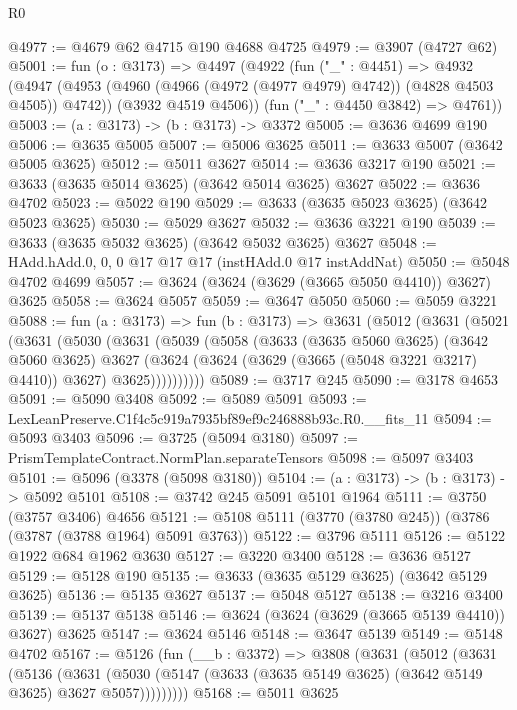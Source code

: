 \begin{lexlean}{R0}
\begin{coremodule}
@4977 := @4679 @62 @4715 @190 @4688 @4725
@4979 := @3907 (@4727 @62)
@5001 := fun (o : @3173) =>
  @4497
    (@4922
      (fun ("_" : @4451) =>
      @4932
        (@4947 (@4953 (@4960 (@4966 (@4972 (@4977 @4979) @4742)) (@4828 @4503 @4505)) @4742))
        (@3932 @4519 @4506))
      (fun ("_" : @4450 @3842) => @4761))
@5003 := (a : @3173) -> (b : @3173) -> @3372
@5005 := @3636 @4699 @190
@5006 := @3635 @5005
@5007 := @5006 @3625
@5011 := @3633 @5007 (@3642 @5005 @3625)
@5012 := @5011 @3627
@5014 := @3636 @3217 @190
@5021 := @3633 (@3635 @5014 @3625) (@3642 @5014 @3625) @3627
@5022 := @3636 @4702
@5023 := @5022 @190
@5029 := @3633 (@3635 @5023 @3625) (@3642 @5023 @3625)
@5030 := @5029 @3627
@5032 := @3636 @3221 @190
@5039 := @3633 (@3635 @5032 @3625) (@3642 @5032 @3625) @3627
@5048 := HAdd.hAdd.{0, 0, 0} @17 @17 @17 (instHAdd.{0} @17 instAddNat)
@5050 := @5048 @4702 @4699
@5057 := @3624 (@3624 (@3629 (@3665 @5050 @4410)) @3627) @3625
@5058 := @3624 @5057
@5059 := @3647 @5050
@5060 := @5059 @3221
@5088 := fun (a : @3173) =>
  fun (b : @3173) =>
  @3631
    (@5012
      (@3631
        (@5021
          (@3631
            (@5030
              (@3631
                (@5039
                  (@5058
                    (@3633
                      (@3635 @5060 @3625)
                      (@3642 @5060 @3625)
                      @3627
                      (@3624 (@3624 (@3629 (@3665 (@5048 @3221 @3217) @4410)) @3627) @3625))))))))))
@5089 := @3717 @245
@5090 := @3178 @4653
@5091 := @5090 @3408
@5092 := @5089 @5091
@5093 := LexLeanPreserve.C1f4c5c919a7935bf89ef9c246888b93c.R0.__fits_11
@5094 := @5093 @3403
@5096 := @3725 (@5094 @3180)
@5097 := PrismTemplateContract.NormPlan.separateTensors
@5098 := @5097 @3403
@5101 := @5096 (@3378 (@5098 @3180))
@5104 := (a : @3173) -> (b : @3173) -> @5092 @5101
@5108 := @3742 @245 @5091 @5101 @1964
@5111 := @3750 (@3757 @3406) @4656
@5121 := @5108 @5111 (@3770 (@3780 @245)) (@3786 (@3787 (@3788 @1964) @5091 @3763))
@5122 := @3796 @5111
@5126 := @5122 @1922 @684 @1962 @3630
@5127 := @3220 @3400
@5128 := @3636 @5127
@5129 := @5128 @190
@5135 := @3633 (@3635 @5129 @3625) (@3642 @5129 @3625)
@5136 := @5135 @3627
@5137 := @5048 @5127
@5138 := @3216 @3400
@5139 := @5137 @5138
@5146 := @3624 (@3624 (@3629 (@3665 @5139 @4410)) @3627) @3625
@5147 := @3624 @5146
@5148 := @3647 @5139
@5149 := @5148 @4702
@5167 := @5126
    (fun (__b : @3372) =>
    @3808
      (@3631
        (@5012
          (@3631
            (@5136
              (@3631
                (@5030 (@5147 (@3633 (@3635 @5149 @3625) (@3642 @5149 @3625) @3627 @5057)))))))))
@5168 := @5011 @3625

\end{coremodule}
\end{lexlean}
